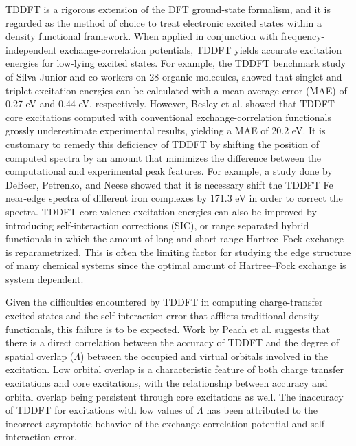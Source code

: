 \documentclass[8.5pt,twoside,twocolumn]{article}
\begin{document}
TDDFT is a rigorous extension of the DFT ground-state formalism,\cite{runge_density-functional_1984} and it is regarded as the method of choice to treat electronic excited states within a density functional framework.
 When applied in conjunction with frequency-independent exchange-correlation potentials, TDDFT yields accurate excitation energies for low-lying excited states. For example, the TDDFT benchmark study of Silva-Junior and co-workers\cite{silva-junior_benchmarks_2008} on 28 organic molecules, showed that singlet and triplet excitation energies can be calculated with a mean average error (MAE) of 0.27 eV and 0.44 eV, respectively. However, Besley et al.\cite{besley_self-consistent-field_2009} showed that TDDFT core excitations computed with conventional exchange-correlation functionals grossly underestimate experimental results, yielding a MAE of 20.2 eV. It is customary to remedy this deficiency of TDDFT by shifting the position of computed spectra by an amount that minimizes the difference between the computational and experimental peak features. For example, a study done by DeBeer, Petrenko, and Neese\cite{debeer_george_prediction_2008} showed that it is necessary shift the TDDFT Fe near-edge spectra of different iron complexes by 171.3 eV in order to correct the spectra.
 TDDFT core-valence excitation energies can also be improved by introducing self-interaction corrections (SIC),\cite{tu_core_2007} or range separated hybrid functionals in which the amount of long and short range Hartree--Fock exchange is reparametrized.\cite{besley_time-dependent_2009, nakata_time-dependent_2006} This is often the limiting factor for studying the edge structure of many chemical systems since the optimal amount of Hartree--Fock exchange is system dependent.\cite{capano_role_2013,besley_time-dependent_2007,besley_time-dependent_2010}

Given the difficulties encountered by TDDFT in computing charge-transfer excited states\cite{dreuw_failure_2004} and the self interaction error that afflicts traditional density functionals, this failure is to be expected.
Work by Peach et al. \cite{peach_excitation_2008} suggests that there is a direct correlation between the accuracy of TDDFT and the degree of spatial overlap ($\Lambda$) between the occupied and virtual orbitals involved in the excitation. Low orbital overlap is a characteristic feature of both charge transfer excitations and core excitations, with the relationship between accuracy and orbital overlap being persistent through core excitations as well. \cite{besley_time-dependent_2009}
The inaccuracy of TDDFT for excitations with low values of $\Lambda$ has been attributed to the incorrect asymptotic behavior of the exchange-correlation potential and self-interaction error.\cite{peach_excitation_2008}
\end{document}
